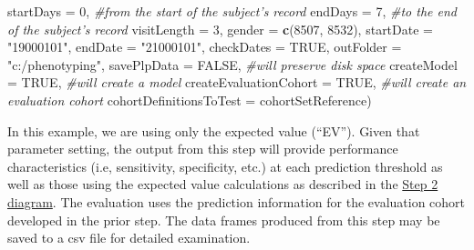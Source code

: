 \documentclass[
]{article}
\newenvironment{Shaded}{\begin{snugshade}}{\end{snugshade}}
\newcommand{\CommentTok}[1]{\textcolor[rgb]{0.56,0.35,0.01}{\textit{#1}}}
\newcommand{\DataTypeTok}[1]{\textcolor[rgb]{0.13,0.29,0.53}{#1}}
\newcommand{\DecValTok}[1]{\textcolor[rgb]{0.00,0.00,0.81}{#1}}
\newcommand{\KeywordTok}[1]{\textcolor[rgb]{0.13,0.29,0.53}{\textbf{#1}}}
\newcommand{\NormalTok}[1]{#1}
\newcommand{\OtherTok}[1]{\textcolor[rgb]{0.56,0.35,0.01}{#1}}
\newcommand{\StringTok}[1]{\textcolor[rgb]{0.31,0.60,0.02}{#1}}
\begin{document}
\begin{Shaded}
\begin{Highlighting}[]
                \DataTypeTok{startDays =} \DecValTok{0}\NormalTok{, }\CommentTok{#from the start of the subject's record}
                \DataTypeTok{endDays =} \DecValTok{7}\NormalTok{, }\CommentTok{#to the end of the subject's record}
                \DataTypeTok{visitLength =} \DecValTok{3}\NormalTok{,}
                \DataTypeTok{gender =} \KeywordTok{c}\NormalTok{(}\DecValTok{8507}\NormalTok{, }\DecValTok{8532}\NormalTok{),}
                \DataTypeTok{startDate =} \StringTok{"19000101"}\NormalTok{,}
                \DataTypeTok{endDate =} \StringTok{"21000101"}\NormalTok{,}
                \DataTypeTok{checkDates =} \OtherTok{TRUE}\NormalTok{,}
                \DataTypeTok{outFolder =} \StringTok{"c:/phenotyping"}\NormalTok{,}
                \DataTypeTok{savePlpData =} \OtherTok{FALSE}\NormalTok{, }\CommentTok{#will preserve disk space}
                \DataTypeTok{createModel =} \OtherTok{TRUE}\NormalTok{, }\CommentTok{#will create a model}
                \DataTypeTok{createEvaluationCohort =} \OtherTok{TRUE}\NormalTok{, }\CommentTok{#will create an evaluation cohort}
                \DataTypeTok{cohortDefinitionsToTest =}\NormalTok{ cohortSetReference)}
\end{Highlighting}
\end{Shaded}

In this example, we are using only the expected value (``EV''). Given
that parameter setting, the output from this step will provide
performance characteristics (i.e, sensitivity, specificity, etc.) at
each prediction threshold as well as those using the expected value
calculations as described in the \href{vignettes/Figure2.png}{Step 2
diagram}. The evaluation uses the prediction information for the
evaluation cohort developed in the prior step. The data frames produced
from this step may be saved to a csv file for detailed examination.
\end{document}
